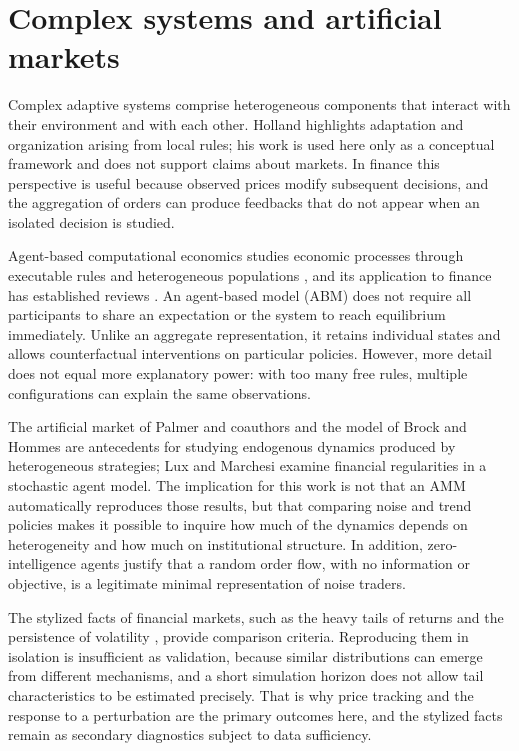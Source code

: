 \section{Complex systems and artificial markets}

Complex adaptive systems comprise heterogeneous components that interact with their environment and with each other. Holland \cite{holland1995hidden} highlights adaptation and organization arising from local rules; his work is used here only as a conceptual framework and does not support claims about markets. In finance this perspective is useful because observed prices modify subsequent decisions, and the aggregation of orders can produce feedbacks that do not appear when an isolated decision is studied.

Agent-based computational economics studies economic processes through executable rules and heterogeneous populations \cite{tesfatsion2003agent}, and its application to finance has established reviews \cite{lebaron2006agent,hommes2006heterogeneous,axtell2025agent}. An agent-based model (ABM) does not require all participants to share an expectation or the system to reach equilibrium immediately. Unlike an aggregate representation, it retains individual states and allows counterfactual interventions on particular policies. However, more detail does not equal more explanatory power: with too many free rules, multiple configurations can explain the same observations.

The artificial market of Palmer and coauthors \cite{palmer1994artificial} and the model of Brock and Hommes \cite{brock1998heterogeneous} are antecedents for studying endogenous dynamics produced by heterogeneous strategies; Lux and Marchesi \cite{lux1999scaling} examine financial regularities in a stochastic agent model. The implication for this work is not that an AMM automatically reproduces those results, but that comparing noise and trend policies makes it possible to inquire how much of the dynamics depends on heterogeneity and how much on institutional structure. In addition, zero-intelligence agents \cite{gode1993allocative,farmer2005predictive} justify that a random order flow, with no information or objective, is a legitimate minimal representation of noise traders.

The stylized facts of financial markets, such as the heavy tails of returns and the persistence of volatility \cite{cont2001empirical}, provide comparison criteria. Reproducing them in isolation is insufficient as validation, because similar distributions can emerge from different mechanisms, and a short simulation horizon does not allow tail characteristics to be estimated precisely. That is why price tracking and the response to a perturbation are the primary outcomes here, and the stylized facts remain as secondary diagnostics subject to data sufficiency.

